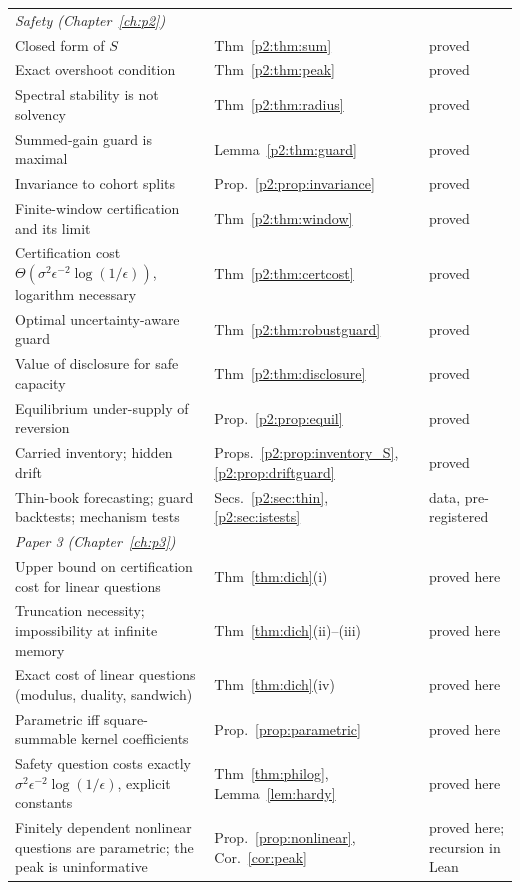 \begin{longtable}{p{}p{}p{}}
\midrule
\multicolumn{3}{l}{\emph{Safety (Chapter~\ref{ch:p2})}}\\
Closed form of $S$ & Thm~\ref{p2:thm:sum} & proved\\
Exact overshoot condition & Thm~\ref{p2:thm:peak} & proved\\
Spectral stability is not solvency & Thm~\ref{p2:thm:radius} & proved\\
Summed-gain guard is maximal & Lemma~\ref{p2:thm:guard} & proved\\
Invariance to cohort splits & Prop.~\ref{p2:prop:invariance} & proved\\
Finite-window certification and its limit & Thm~\ref{p2:thm:window} & proved\\
Certification cost $\Theta(\sigma^2\epsilon^{-2}\log(1/\epsilon))$, logarithm necessary & Thm~\ref{p2:thm:certcost} & proved\\
Optimal uncertainty-aware guard & Thm~\ref{p2:thm:robustguard} & proved\\
Value of disclosure for safe capacity & Thm~\ref{p2:thm:disclosure} & proved\\
Equilibrium under-supply of reversion & Prop.~\ref{p2:prop:equil} & proved\\
Carried inventory; hidden drift & Props.~\ref{p2:prop:inventory_S}, \ref{p2:prop:driftguard} & proved\\
Thin-book forecasting; guard backtests; mechanism tests & Secs.~\ref{p2:sec:thin}, \ref{p2:sec:istests} & data, pre-registered\\
\midrule
\multicolumn{3}{l}{\emph{Paper 3 (Chapter~\ref{ch:p3})}}\\
Upper bound on certification cost for linear questions & Thm~\ref{thm:dich}(i) & proved here\\
Truncation necessity; impossibility at infinite memory & Thm~\ref{thm:dich}(ii)--(iii) & proved here\\
Exact cost of linear questions (modulus, duality, sandwich) & Thm~\ref{thm:dich}(iv) & proved here\\
Parametric iff square-summable kernel coefficients & Prop.~\ref{prop:parametric} & proved here\\
Safety question costs exactly $\sigma^2\epsilon^{-2}\log(1/\epsilon)$, explicit constants & Thm~\ref{thm:philog}, Lemma~\ref{lem:hardy} & proved here\\
Finitely dependent nonlinear questions are parametric; the peak is uninformative & Prop.~\ref{prop:nonlinear}, Cor.~\ref{cor:peak} & proved here; recursion in Lean\\

\end{longtable}
